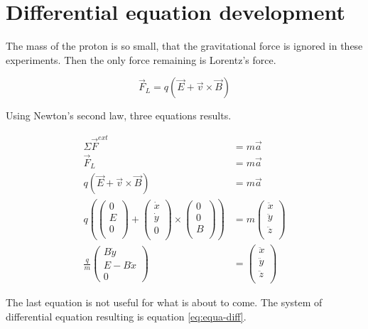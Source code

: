 \documentclass[a4paper,12pt,twoside]{article}
\begin{document}
\section{Differential equation development} \label{ann:dev-eq-diff}
The mass of the proton is so small, that the gravitational force is ignored in these experiments.
Then the only force remaining is Lorentz's force.

\begin{equation}
	\vec{F}_L = q(\vec{E} + \vec{v}\times\vec{B})
	\label{eq:lorentz-force}
\end{equation}

Using Newton's second law, three equations results.

\begin{align*}
	\Sigma\vec{F}^{ext} &= m\vec{a} \\
	\vec{F}_L &= m\vec{a}\\
	q(\vec{E} + \vec{v}\times\vec{B}) &= m\vec{a} \\
	q\left( \begin{pmatrix} 0\\ E\\ 0\\ \end{pmatrix} + \begin{pmatrix} \dot{x}\\ \dot{y}\\ 0\\ \end{pmatrix} \times \begin{pmatrix} 0\\ 0\\ B\\ \end{pmatrix}\right) &= m\begin{pmatrix} \ddot{x}\\ \ddot{y}\\ \ddot{z}\\ \end{pmatrix} \\
	\frac{q}{m}\begin{pmatrix} B\dot{y}\\ E - B\dot{x}\\ 0 \end{pmatrix} &= \begin{pmatrix} \ddot{x}\\ \ddot{y}\\ \ddot{z}\\ \end{pmatrix}
\end{align*}

The last equation is not useful for what is about to come.
The system of differential equation resulting is equation \ref{eq:equa-diff}.
\end{document}
